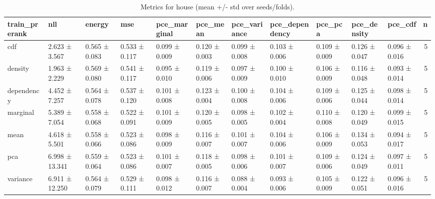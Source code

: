 \begin{table}
\caption{Metrics for house (mean +/- std over seeds/folds).}
\label{tab:metrics_summary_house}
\begin{tabular}{lllllllllllr}
\toprule
train_prerank & nll & energy & mse & pce_marginal & pce_mean & pce_variance & pce_dependency & pce_pca & pce_density & pce_cdf & n \\
\midrule
cdf & 2.623 ± 3.567 & 0.565 ± 0.083 & 0.533 ± 0.117 & 0.099 ± 0.009 & 0.120 ± 0.003 & 0.099 ± 0.008 & 0.103 ± 0.006 & 0.109 ± 0.009 & 0.126 ± 0.047 & 0.096 ± 0.016 & 5 \\
density & 1.963 ± 2.229 & 0.569 ± 0.080 & 0.541 ± 0.117 & 0.095 ± 0.010 & 0.119 ± 0.006 & 0.097 ± 0.009 & 0.100 ± 0.010 & 0.106 ± 0.009 & 0.116 ± 0.048 & 0.093 ± 0.014 & 5 \\
dependency & 4.452 ± 7.257 & 0.564 ± 0.078 & 0.537 ± 0.120 & 0.101 ± 0.008 & 0.123 ± 0.004 & 0.100 ± 0.008 & 0.104 ± 0.006 & 0.109 ± 0.006 & 0.125 ± 0.044 & 0.098 ± 0.014 & 5 \\
marginal & 5.389 ± 7.054 & 0.558 ± 0.068 & 0.522 ± 0.091 & 0.101 ± 0.009 & 0.120 ± 0.005 & 0.098 ± 0.005 & 0.102 ± 0.004 & 0.110 ± 0.008 & 0.120 ± 0.049 & 0.099 ± 0.015 & 5 \\
mean & 4.618 ± 5.501 & 0.558 ± 0.066 & 0.523 ± 0.086 & 0.098 ± 0.009 & 0.116 ± 0.007 & 0.101 ± 0.007 & 0.104 ± 0.006 & 0.106 ± 0.009 & 0.134 ± 0.053 & 0.094 ± 0.017 & 5 \\
pca & 6.998 ± 13.341 & 0.559 ± 0.064 & 0.523 ± 0.086 & 0.101 ± 0.007 & 0.118 ± 0.005 & 0.098 ± 0.006 & 0.101 ± 0.007 & 0.109 ± 0.006 & 0.124 ± 0.049 & 0.097 ± 0.011 & 5 \\
variance & 6.911 ± 12.250 & 0.564 ± 0.079 & 0.529 ± 0.111 & 0.098 ± 0.012 & 0.116 ± 0.007 & 0.088 ± 0.004 & 0.093 ± 0.006 & 0.105 ± 0.009 & 0.122 ± 0.051 & 0.096 ± 0.016 & 5 \\
\bottomrule
\end{tabular}
\end{table}
